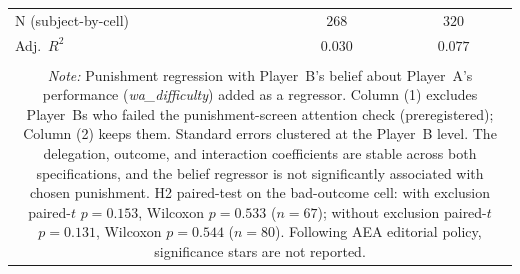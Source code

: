 \begin{table}[!htbp]
\begin{tabular}{lcc}
 N (subject-by-cell) & $268$ & $320$ \\
 Adj.\ $R^2$ & $0.030$ & $0.077$ \\
\hline
\hline \\[-1.8ex]
\multicolumn{3}{c}{\begin{minipage}{0.85\textwidth}\footnotesize \textit{Note:} Punishment regression with Player~B's belief about Player~A's performance (\textit{wa\_difficulty}) added as a regressor. Column (1) excludes Player~Bs who failed the punishment-screen attention check (preregistered); Column (2) keeps them. Standard errors clustered at the Player~B level. The delegation, outcome, and interaction coefficients are stable across both specifications, and the belief regressor is not significantly associated with chosen punishment. H2 paired-test on the bad-outcome cell: with exclusion paired-$t$ $p=0.153$, Wilcoxon $p=0.533$ ($n=67$); without exclusion paired-$t$ $p=0.131$, Wilcoxon $p=0.544$ ($n=80$). Following AEA editorial policy, significance stars are not reported.\end{minipage}}
\end{tabular}
\end{table}
